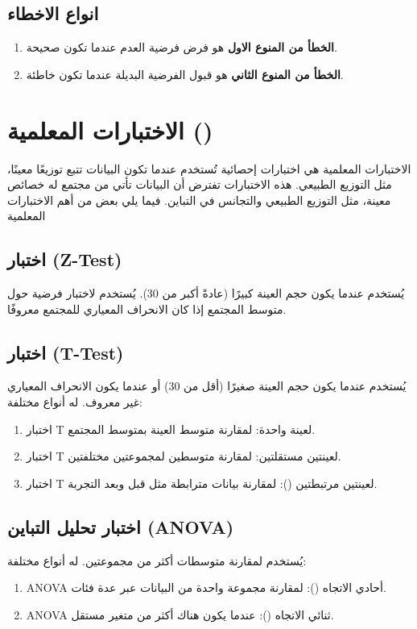 \subsection{انواع الاخطاء}
\begin{enumerate}
	\item \textbf{الخطأ من المنوع الاول} هو فرض فرضية العدم عندما تكون صحيحة.
	\item \textbf{الخطأ من المنوع الثاني} هو قبول الفرضية البديلة عندما تكون خاطئة.
\end{enumerate}

\section{الاختبارات المعلمية  ()}
الاختبارات المعلمية هي اختبارات إحصائية تُستخدم عندما تكون البيانات تتبع توزيعًا معينًا، مثل التوزيع الطبيعي. هذه الاختبارات تفترض أن البيانات تأتي من مجتمع له خصائص معينة، مثل التوزيع الطبيعي والتجانس في التباين. فيما يلي بعض من أهم الاختبارات المعلمية

\subsection{اختبار (Z-Test)}
يُستخدم عندما يكون حجم العينة كبيرًا (عادةً أكبر من 30).
يُستخدم لاختبار فرضية حول متوسط المجتمع إذا كان الانحراف المعياري للمجتمع معروفًا.

\subsection{اختبار (T-Test)}
يُستخدم عندما يكون حجم العينة صغيرًا (أقل من 30) أو عندما يكون الانحراف المعياري غير معروف.
له أنواع مختلفة: 
\begin{enumerate}
\item  	اختبار T لعينة واحدة: لمقارنة متوسط العينة بمتوسط المجتمع.
\item  	اختبار T لعينتين مستقلتين: لمقارنة متوسطين لمجموعتين مختلفتين.
\item  	اختبار T لعينتين مرتبطتين (): لمقارنة بيانات مترابطة مثل قبل وبعد التجربة.
\end{enumerate}

\subsection{اختبار تحليل التباين (ANOVA)}
يُستخدم لمقارنة متوسطات أكثر من مجموعتين.
له أنواع مختلفة: 
\begin{enumerate}
\item  	ANOVA أحادي الاتجاه (): لمقارنة مجموعة واحدة من البيانات عبر عدة فئات.
\item  	ANOVA ثنائي الاتجاه (): عندما يكون هناك أكثر من متغير مستقل.
\end{enumerate}

